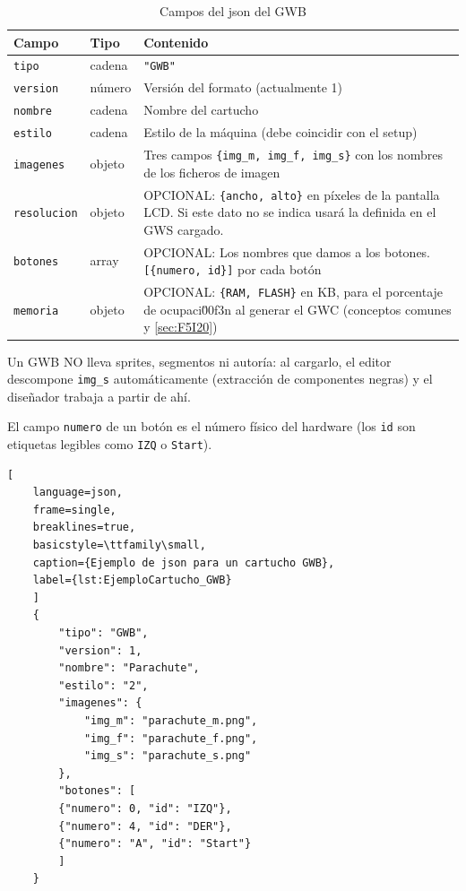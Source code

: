 \begin{table}[H]
	\centering
	\begin{tabular}{llp{10cm}}
		\toprule
		Campo & Tipo & Contenido \\
		\midrule
		\texttt{tipo} & cadena & \texttt{"GWB"} \\
		\texttt{version} & número & Versión del formato (actualmente 1) \\
		\texttt{nombre} & cadena & Nombre del cartucho \\
		\texttt{estilo} & cadena & Estilo de la máquina (debe coincidir con el setup) \\
		\texttt{imagenes} & objeto & Tres campos \texttt{\{img\_m, img\_f, img\_s\}} con los  nombres de los ficheros de imagen \\
		\texttt{resolucion} & objeto & OPCIONAL: \texttt{\{ancho, alto\}} en píxeles de la pantalla LCD. Si este dato no se indica usará la definida en el GWS cargado. \\
		\texttt{botones} & array & OPCIONAL: Los nombres que damos a los botones. \texttt{[\{numero, id\}]} por cada botón \\
		\texttt{memoria} & objeto & OPCIONAL: \texttt{\{RAM, FLASH\}} en KB, para el porcentaje de ocupaci\u00f3n al generar el GWC (conceptos comunes y \ref{sec:F5I20}) \\
		\bottomrule
	\end{tabular}
	\caption{Campos del json del GWB}
	\label{tab:F1A01GWB}
\end{table}

Un GWB NO lleva sprites, segmentos ni autoría: al cargarlo, el editor
descompone \texttt{img\_s} automáticamente (extracción de componentes
negras) y el diseñador trabaja a partir de ahí. 

El campo \texttt{numero} de un botón es el número físico del hardware (los
\texttt{id} son etiquetas legibles como \texttt{IZQ} o \texttt{Start}).

\begin{lstlisting}[
	language=json, 
	frame=single, 
	breaklines=true, 
	basicstyle=\ttfamily\small,
	caption={Ejemplo de json para un cartucho GWB},
	label={lst:EjemploCartucho_GWB}
	]
	{
		"tipo": "GWB",
		"version": 1,
		"nombre": "Parachute",
		"estilo": "2",
		"imagenes": {
			"img_m": "parachute_m.png",
			"img_f": "parachute_f.png",
			"img_s": "parachute_s.png"
		},
		"botones": [
		{"numero": 0, "id": "IZQ"},
		{"numero": 4, "id": "DER"},
		{"numero": "A", "id": "Start"}
		]
	}
\end{lstlisting}

